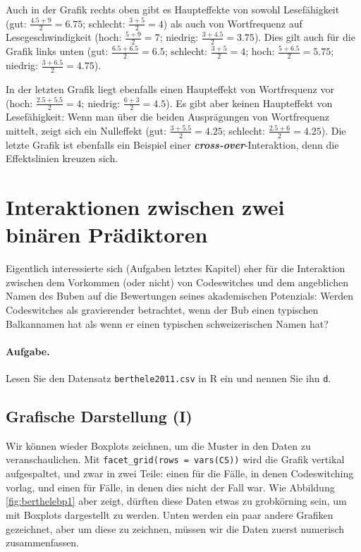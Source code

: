\documentclass[oneside, 10pt]{book}\usepackage[]{graphicx}\usepackage[]{xcolor}
\begin{document}
Auch in der Grafik rechts oben gibt es Haupteffekte von sowohl Lesefähigkeit
(gut: $\frac{4.5+9}{2}=6.75$; schlecht: $\frac{3+5}{2}=4$)
als auch von Wortfrequenz auf Lesegeschwindigkeit
(hoch: $\frac{5+9}{2}=7$; niedrig: $\frac{3+4.5}{2}=3.75$).
Dies gilt auch für die Grafik links unten
(gut: $\frac{6.5+6.5}{2}=6.5$; schlecht: $\frac{3+5}{2}=4$;
hoch: $\frac{5+6.5}{2}=5.75$; niedrig: $\frac{3+6.5}{2}=4.75$).

In der letzten Grafik liegt ebenfalls einen Haupteffekt
von Wortfrequenz vor (hoch: $\frac{2.5+5.5}{2}=4$; niedrig: $\frac{6+3}{2}=4.5$).
Es gibt aber keinen Haupteffekt von Lesefähigkeit:
Wenn man über die beiden Ausprägungen von Wortfrequenz mittelt, zeigt sich ein Nulleffekt
(gut: $\frac{3+5.5}{2}=4.25$; schlecht: $\frac{2.5+6}{2}=4.25$).
Die letzte Grafik ist ebenfalls ein Beispiel einer \textbf{\textit{cross-over}}-Interaktion,
denn die Effektslinien kreuzen sich.

\section{Interaktionen zwischen zwei binären Prädiktoren}
\label{sec:berthele2011b}
Eigentlich interessierte sich \citet{Berthele2011b} (Aufgaben letztes Kapitel)
eher für die Interaktion zwischen dem Vorkommen (oder nicht) von Codeswitches
und dem angeblichen Namen des Buben auf die Bewertungen seines akademischen Potenzials:
Werden Codeswitches als gravierender betrachtet,
wenn der Bub einen typischen Balkannamen hat als wenn er einen typischen
schweizerischen Namen hat?

\paragraph{Aufgabe.} Lesen Sie den Datensatz \texttt{berthele2011.csv} in R ein und nennen Sie ihn \texttt{d}.



\subsection{Grafische Darstellung (I)}
Wir können wieder Boxplots zeichnen, um die Muster in den Daten zu veranschaulichen.
Mit \texttt{facet\_grid(rows = vars(CS))} wird die Grafik vertikal aufgespaltet,
und zwar in zwei Teile: 
einen für die Fälle, in denen Codeswitching vorlag, 
und einen für Fälle, in denen dies nicht der Fall war.
Wie Abbildung \ref{fig:berthelebp1} aber zeigt, 
dürften diese Daten etwas zu grobkörning sein,
um mit Boxplots dargestellt zu werden. Unten werden ein paar andere Grafiken
gezeichnet, aber um diese zu zeichnen, müssen wir die Daten zuerst numerisch zusammenfassen.
\end{document}
